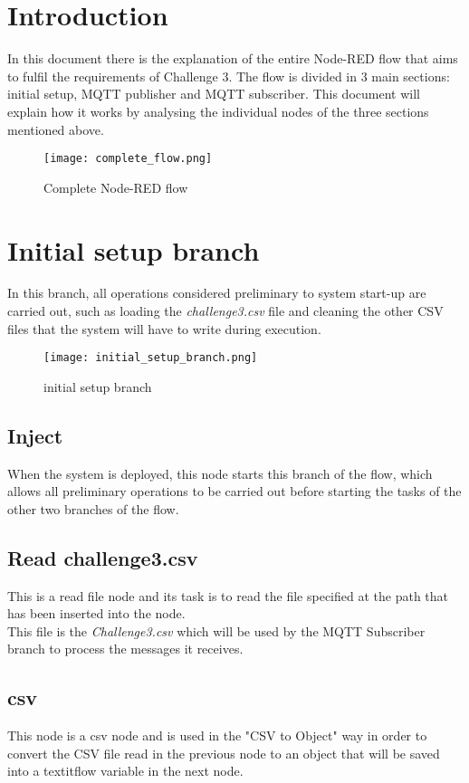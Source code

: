 \section{Introduction}
In this document there is the explanation of the entire Node-RED flow that aims to fulfil the requirements of Challenge 3.
The flow is divided in 3 main sections: initial setup, MQTT publisher and MQTT subscriber.
This document will explain how it works by analysing the individual nodes of the three sections mentioned above.

\begin{figure}[H]
    \centering
    \texttt{[image: complete\_flow.png]}
    \caption{Complete Node-RED flow}
\end{figure}

\section{Initial setup branch}
In this branch, all operations considered preliminary to system start-up are carried out, such as loading the \textit{challenge3.csv} file and cleaning the other CSV files that the system will have to write during execution.
\label{sec:initial_setup_branch}
\begin{figure}[H]
    \centering
    \texttt{[image: initial\_setup\_branch.png]}
    \caption{initial setup branch}
\end{figure}
\subsection{Inject}
When the system is deployed, this node starts this branch of the flow, which allows all preliminary operations to be carried out before starting the tasks of the other two branches of the flow.

\subsection{Read challenge3.csv }
This is a read file node and its task is to read the file specified at the path that has been inserted into the node.\\
This file is the \textit{Challenge3.csv} which will be used by the MQTT Subscriber branch to process the messages it receives.

\subsection{csv}
This node is a csv node and is used in the "CSV to Object" way in order to convert the CSV file read in the previous node to an object that will be saved into a textit{flow} variable in the next node.

